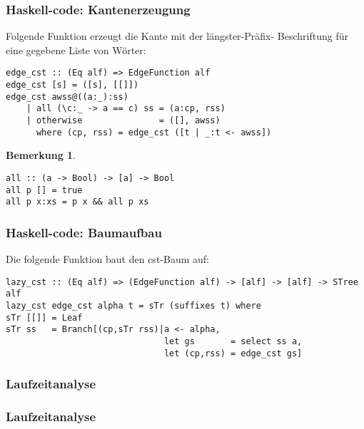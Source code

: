 \documentclass{beamer}
\newtheorem{remark}[theorem]{Bemerkung}
\begin{document}
\begin{frame}[fragile]
\frametitle{Haskell-code: Kantenerzeugung}
Folgende Funktion erzeugt die Kante mit der längster-Präfix- Beschriftung für eine gegebene Liste von Wörter:
\begin{lstlisting}
edge_cst :: (Eq alf) => EdgeFunction alf
edge_cst [s] = ([s], [[]])
edge_cst awss@((a:_):ss) 
    | all (\c:_ -> a == c) ss = (a:cp, rss)
    | otherwise               = ([], awss)
      where (cp, rss) = edge_cst ([t | _:t <- awss])
\end{lstlisting}
\bigskip
\begin{remark}
\begin{lstlisting}
all :: (a -> Bool) -> [a] -> Bool
all p [] = true
all p x:xs = p x && all p xs
\end{lstlisting}     
\end{remark}
\end{frame}

\begin{frame}[fragile]
\frametitle{Haskell-code: Baumaufbau}
Die folgende Funktion baut den cst-Baum auf:
\begin{lstlisting}
lazy_cst :: (Eq alf) => (EdgeFunction alf) -> [alf] -> [alf] -> STree alf
lazy_cst edge_cst alpha t = sTr (suffixes t) where 
sTr [[]] = Leaf
sTr ss   = Branch[(cp,sTr rss)|a <- alpha,
                               let gs       = select ss a,
                               let (cp,rss) = edge_cst gs]
\end{lstlisting}
\end{frame}

\subsubsection{Laufzeitanalyse}

\begin{frame}[fragile]
\frametitle{Laufzeitanalyse}
\end{frame}
\end{document}
